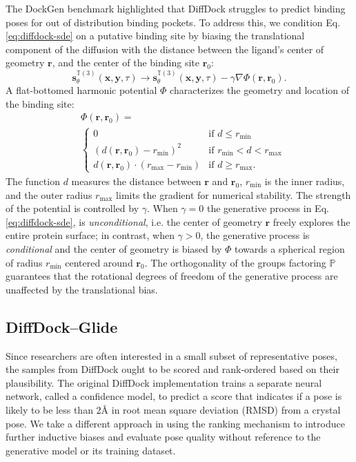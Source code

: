 \documentclass[%
 aip,
 amsmath,amssymb,
reprint,%
]{revtex4-1}
\begin{document}
The DockGen benchmark highlighted that DiffDock struggles to predict binding poses for out of distribution binding pockets.\cite{corso2024dockgen} To address this, we condition Eq. \ref{eq:diffdock-sde} on a putative binding site by biasing the translational component of the diffusion with the distance between the ligand's center of geometry $\mathbf{r}$, and the center of the binding site $\mathbf{r}_0$:
\begin{equation}
    \label{eq:diffdock-sde-conditional}
        \mathbf{s}^{\mathbb{T}(3)}_\theta(\mathbf{x}, \mathbf{y}, \tau)\rightarrow \mathbf{s}^{\mathbb{T}(3)}_\theta(\mathbf{x}, \mathbf{y}, \tau) - \gamma \nabla \Phi(\mathbf{r},\mathbf{r}_0).
\end{equation}
A flat-bottomed harmonic potential $\Phi$ characterizes the geometry and location of the binding site:
\begin{equation}
    \label{eq:potential}
    \begin{aligned}
    &\Phi(\mathbf{r}, \mathbf{r}_0)  = \\
    &\begin{cases} 
    0 &\text{if } d \leq r_{\mathrm{min}} \\
    (d(\mathbf{r},\mathbf{r}_0) - r_{\mathrm{min}})^2 &\text{if } r_{\mathrm{min}} < d < r_{\mathrm{max}} \\
    d(\mathbf{r},\mathbf{r}_0)\cdot (r_{\mathrm{max}} - r_{\mathrm{min}}) &\text{if } d \geq r_{\mathrm{max}}.
    \end{cases}
    \end{aligned}
\end{equation}
The function $d$ measures the distance between $\mathbf{r}$ and $\mathbf{r}_0$, $r_{\mathrm{min}}$ is the inner radius, and the outer radius $r_{\mathrm{max}}$ limits the gradient for numerical stability. The strength of the potential is controlled by $\gamma$. When $\gamma=0$ the generative process in Eq. \ref{eq:diffdock-sde}, is {\it unconditional}, i.e. the center of geometry $\mathbf{r}$ freely explores the entire protein surface; in contrast, when $\gamma > 0$, the generative process is {\it conditional} and the center of geometry is biased by $\Phi$ towards a spherical region of radius $r_\mathrm{min}$ centered around $\mathbf{r}_0$. The orthogonality of the groups factoring $\mathbb{P}$ guarantees that the rotational degrees of freedom of the generative process are unaffected by the translational bias.

\subsection{DiffDock--Glide}
Since researchers are often interested in a small subset of representative poses, the samples from DiffDock ought to be scored and rank-ordered based on their plausibility. The original DiffDock implementation trains a separate neural network, called a confidence model, to predict a score that indicates if a pose is likely to be less than $2${\AA} in root mean square deviation (RMSD) from a crystal pose. We take a different approach in using the ranking mechanism to introduce further inductive biases and evaluate pose quality without reference to the generative model or its training dataset.
\end{document}
